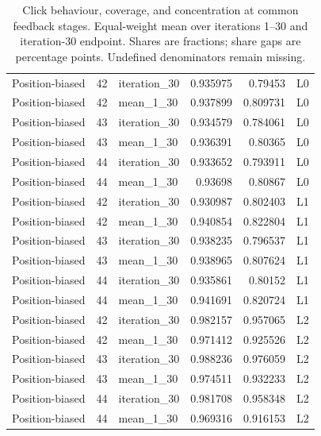 \begin{table}[htbp!]
\begin{tabular}{lrlrrl}
Position-biased & 42 & iteration\_30 & 0.935975 & 0.79453 & L0 \\
Position-biased & 42 & mean\_1\_30 & 0.937899 & 0.809731 & L0 \\
Position-biased & 43 & iteration\_30 & 0.934579 & 0.784061 & L0 \\
Position-biased & 43 & mean\_1\_30 & 0.936391 & 0.80365 & L0 \\
Position-biased & 44 & iteration\_30 & 0.933652 & 0.793911 & L0 \\
Position-biased & 44 & mean\_1\_30 & 0.93698 & 0.80867 & L0 \\
Position-biased & 42 & iteration\_30 & 0.930987 & 0.802403 & L1 \\
Position-biased & 42 & mean\_1\_30 & 0.940854 & 0.822804 & L1 \\
Position-biased & 43 & iteration\_30 & 0.938235 & 0.796537 & L1 \\
Position-biased & 43 & mean\_1\_30 & 0.938965 & 0.807624 & L1 \\
Position-biased & 44 & iteration\_30 & 0.935861 & 0.80152 & L1 \\
Position-biased & 44 & mean\_1\_30 & 0.941691 & 0.820724 & L1 \\
Position-biased & 42 & iteration\_30 & 0.982157 & 0.957065 & L2 \\
Position-biased & 42 & mean\_1\_30 & 0.971412 & 0.925526 & L2 \\
Position-biased & 43 & iteration\_30 & 0.988236 & 0.976059 & L2 \\
Position-biased & 43 & mean\_1\_30 & 0.974511 & 0.932233 & L2 \\
Position-biased & 44 & iteration\_30 & 0.981708 & 0.958348 & L2 \\
Position-biased & 44 & mean\_1\_30 & 0.969316 & 0.916153 & L2 \\
\hline
\end{tabular}
\caption{Click behaviour, coverage, and concentration at common feedback stages. Equal-weight mean over iterations 1--30 and iteration-30 endpoint. Shares are fractions; share gaps are percentage points. Undefined denominators remain missing.}
\label{chap:results:tab:rq2_models_concentration}
\end{table}
